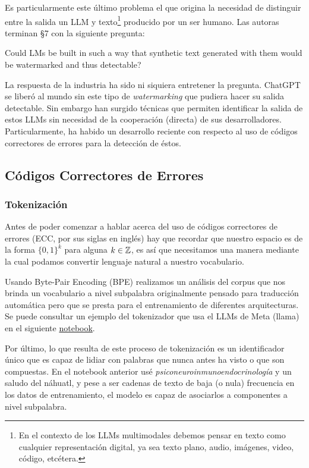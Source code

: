 \documentclass[a4paper,11pt]{article}
\begin{document}
Es particularmente este último problema el que origina la necesidad de distinguir entre la salida un LLM y texto\footnote{En el contexto de los LLMs multimodales debemos pensar en texto como cualquier representación digital, ya sea texto plano, audio, imágenes, video, código, etcétera.} producido por un ser humano. Las autoras terminan \S 7 con la siguiente pregunta:
\begin{displayquote}
    Could LMs be built in such a way that synthetic text generated with them would be watermarked and thus detectable?
\end{displayquote}
\par La respuesta de la industria ha sido ni siquiera entretener la pregunta. ChatGPT se liberó al mundo sin este tipo de \textit{watermarking} que pudiera hacer su salida detectable. Sin embargo han surgido técnicas que permiten identificar la salida de estos LLMs sin necesidad de la cooperación (directa) de sus desarrolladores. Particularmente, ha habido un desarrollo reciente con respecto al uso de códigos correctores de errores para la detección de éstos.
\subsection{Códigos Correctores de Errores}
\subsubsection{Tokenización}
\label{sec:token}
\par Antes de poder comenzar a hablar acerca del uso de códigos correctores de errores (ECC, por sus siglas en inglés) hay que recordar que nuestro espacio es de la forma $\{0,1\}^k$ para alguna $k\in\mathbb{Z}$, es así que necesitamos una manera mediante la cual podamos convertir lenguaje natural a nuestro vocabulario.
\par Usando Byte-Pair Encoding (BPE) \cite{sennrich_neural_2016} realizamos un análisis del corpus que nos brinda un vocabulario a nivel subpalabra originalmente pensado para traducción automática pero que se presta para el entrenamiento de diferentes arquitecturas. Se puede consultar un ejemplo del tokenizador que usa el LLMs de Meta (llama) en el siguiente \href{https://colab.research.google.com/drive/1GlNBf0DbZTonpNINr_cJQ9VolosbFdR4?usp=sharing}{notebook}.
\par Por último, lo que resulta de este proceso de tokenización es un identificador único que es capaz de lidiar con palabras que nunca antes ha visto o que son compuestas. En el notebook anterior usé \textit{psiconeuroinmunoendocrinología} y un saludo del náhuatl, y pese a ser cadenas de texto de baja (o nula) frecuencia en los datos de entrenamiento, el modelo es capaz de asociarlos a componentes a nivel subpalabra.
\end{document}
